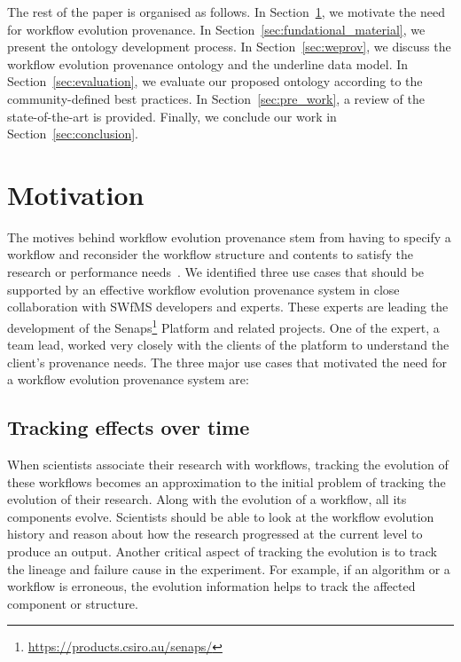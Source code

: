 \documentclass[ao]{iosart2x}
\begin{document}
The rest of the paper is organised as follows. In Section~\ref{sec:motivation}, we motivate the need for workflow evolution provenance. In Section~\ref{sec:fundational_material}, we present the ontology development process. In Section~\ref{sec:weprov}, we discuss
the workflow evolution provenance ontology and the underline data model. In Section~\ref{sec:evaluation}, we evaluate our proposed ontology according to the community-defined best practices. In Section~\ref{sec:pre_work}, a review of the state-of-the-art is provided. Finally, we conclude our work in Section~\ref{sec:conclusion}.

\section{Motivation}
\label{sec:motivation}
The motives behind workflow evolution provenance stem from having to specify a workflow and reconsider the workflow structure and contents to satisfy the research or performance needs~\citep{koop2010provenance}. 
We identified three use cases that should be supported by an effective workflow evolution provenance system in close collaboration with SWfMS developers and experts. These experts are leading the development of the Senaps\footnote{\url{https://products.csiro.au/senaps/}} Platform and related projects. One of the expert, a team lead, worked very closely with the clients of the platform to understand the client's provenance needs. 
The three major use cases that motivated the need for a workflow evolution provenance system are:

\subsection{Tracking effects over time} 
When scientists associate their research with workflows, tracking the evolution of these workflows becomes an approximation to the initial problem of tracking the evolution of their research. Along with the evolution of a workflow, all its components evolve. Scientists should be able to look at the workflow evolution history and reason about how the research progressed at the current level to produce an output. 
Another critical aspect of tracking the evolution is to track the lineage and failure cause in the experiment. For example, 
if an algorithm or a workflow is erroneous, the evolution information helps to track the affected component or structure. %
\end{document}
